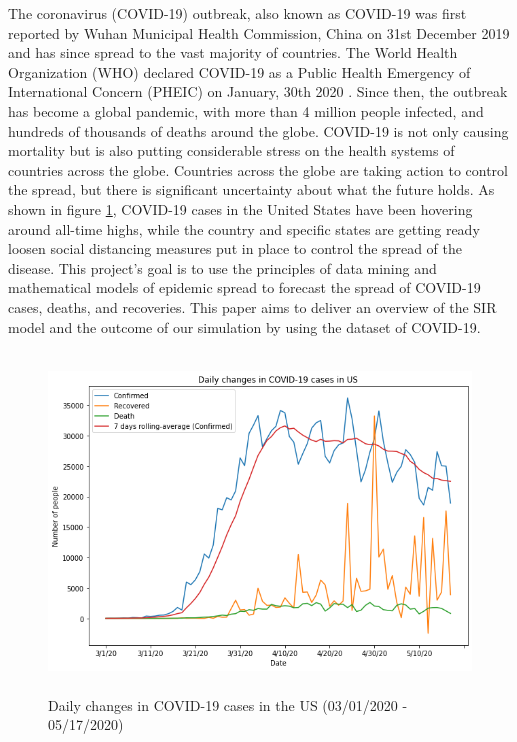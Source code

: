 \documentclass[11pt]{article}
\begin{document}
The coronavirus (COVID-19) outbreak, also known as COVID-19 was first reported by Wuhan Municipal Health Commission, China on 31st December 2019 and has since spread to the vast majority of countries. The World Health Organization (WHO) declared COVID-19 as a Public Health Emergency of International Concern (PHEIC) on January, 30th 2020 \cite{who-website}. Since then, the outbreak has become a global pandemic, with more than 4 million people infected, and hundreds of thousands of deaths around the globe. COVID-19 is not only causing mortality but is also putting considerable stress on the health systems of countries across the globe. Countries across the globe are taking action to control the spread, but there is significant uncertainty about what the future holds. As shown in figure \ref{fig:covid-cases-daily-changes-us}, COVID-19 cases in the United States have been hovering around all-time highs, while the country and specific states are getting ready loosen social distancing measures put in place to control the spread of the disease. This project's goal is to use the principles of data mining and mathematical models of epidemic spread to forecast the spread of COVID-19 cases, deaths, and recoveries. This paper aims to deliver an overview of the SIR model and the outcome of our simulation by using the dataset of COVID-19.

\begin{figure}[h]
\includegraphics[width=14cm, height=9cm]{images/daily-numbers.png}
\centering
\caption{Daily changes in COVID-19 cases in the US (03/01/2020 - 05/17/2020)}
\label{fig:covid-cases-daily-changes-us}
\end{figure}

\end{document}
